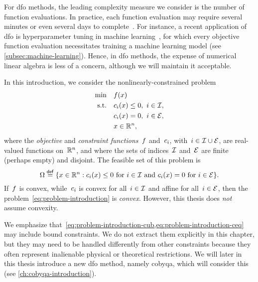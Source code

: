 For \gls{dfo} methods, the leading complexity measure we consider is the number of function evaluations.
In practice, each function evaluation may require several minutes or even several days to complete~\cite[\S~1.4]{Audet_Hare_2017}.
For instance, a recent application of \gls{dfo} is hyperparameter tuning in machine learning~\cite{Ghanbari_Scheinberg_2017}, for which every objective function evaluation necessitates training a machine learning model (see \cref{subsec:machine-learning}).
Hence, in \gls{dfo} methods, the expense of numerical linear algebra is less of a concern, although we will maintain it acceptable.

In this introduction, we consider the nonlinearly-constrained problem
\begin{subequations}
    \label{eq:problem-introduction}
    \begin{align}
        \min        & \quad f(x)\\
        \text{s.t.} & \quad c_{i}(x) \le 0, ~ i \in \mathcal{I}, \label{eq:problem-introduction-cub}\\
                    & \quad c_{i}(x) = 0, ~ i \in \mathcal{E}, \label{eq:problem-introduction-ceq}\\
                    & \quad x \in \mathbb{R}^n, \nonumber
    \end{align}
\end{subequations}
where the \emph{objective} and \emph{constraint functions}~$f$ and~$c_{i}$, with~$i \in \mathcal{I} \cup \mathcal{E}$, are real-valued functions on~$\mathbb{R}^n$, and where the sets of indices~$\mathcal{I}$ and~$\mathcal{E}$ are finite (perhaps empty) and disjoint.
The feasible set of this problem is
\begin{equation*}
    \Omega \mathrel{\stackrel{\mathsf{def}}{=}} \{x \in \mathbb{R}^n : \text{$c_{i}(x) \le 0$ for~$i \in \mathcal{I}$ and~$c_{i}(x) = 0$ for~$i \in \mathcal{E}$}\}.
\end{equation*}
If~$f$ is convex, while~$c_{i}$ is convex for all~$i \in \mathcal{I}$ and affine for all~$i \in \mathcal{E}$, then the problem~\cref{eq:problem-introduction} is \emph{convex}.
However, this thesis does \emph{not} assume convexity.

We emphasize that~\cref{eq:problem-introduction-cub,eq:problem-introduction-ceq} may include bound constraints.
We do not extract them explicitly in this chapter, but they may need to be handled differently from other constraints because they often represent inalienable physical or theoretical restrictions.
We will later in this thesis introduce a new \gls{dfo} method, namely \gls{cobyqa}, which will consider this (see \cref{ch:cobyqa-introduction}).


